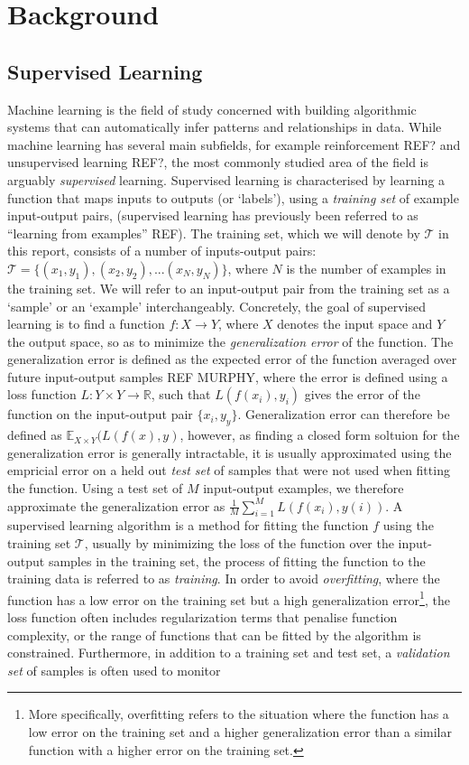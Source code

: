 \chapter{Background}

\section{Supervised Learning}
Machine learning is the field of study concerned with building algorithmic systems that can automatically infer patterns and relationships in data. While machine learning has several main subfields, for example reinforcement REF? and unsupervised learning REF?, the most commonly studied area of the field is arguably \textit{supervised} learning. Supervised learning is characterised by learning a function that maps inputs to outputs (or `labels'), using a \textit{training set} of example input-output pairs, (supervised learning has previously been referred to as ``learning from examples'' REF). The training set, which we will denote by $\mathcal{T}$ in this report, consists of a number of inputs-output pairs: $\mathcal{T} = \{(x_1,y_1),(x_2,y_2),...(x_N,y_N)\}$, where $N$ is the number of examples in the training set. We will refer to an input-output pair from the training set as a `sample' or an `example' interchangeably. Concretely, the goal of supervised learning is to find a function $f : X \rightarrow Y$, where $X$ denotes the input space and $Y$ the output space, so as to minimize the \textit{generalization error} of the function. The generalization error is defined as the expected error of the function averaged over future input-output samples REF MURPHY, where the error is defined using a loss function $L:Y \times Y \rightarrow \mathbb{R}$, such that $L(f(x_i),y_i)$ gives the error of the function on the input-output pair $\{x_i,y_y\}$. Generalization error can therefore be defined as $\mathbb{E}_{X\times Y}(L(f(x),y)$, however, as finding a closed form soltuion for the generalization error is generally intractable, it is usually approximated using the empricial error on a held out \textit{test set} of samples that were not used when fitting the function. Using a test set of $M$ input-output examples, we therefore approximate the generalization error as $\frac{1}{M}\sum_{i=1}^{M} L(f(x_i),y(i))$. A supervised learning algorithm is a method for fitting the function $f$ using the training set $\mathcal{T}$, usually by minimizing the loss of the function over the input-output samples in the training set, the process of fitting the function to the training data is referred to as \textit{training}. In order to avoid \textit{overfitting}, where the function has a low error on the training set but a high generalization error\footnote{More specifically, overfitting refers to the situation where the function has a low error on the training set and a higher generalization error than a similar function with a higher error on the training set.}, the loss function often includes regularization terms that penalise function complexity, or the range of functions that can be fitted by the algorithm is constrained. Furthermore, in addition to a training set and test set, a \textit{validation set} of samples is often used to monitor 